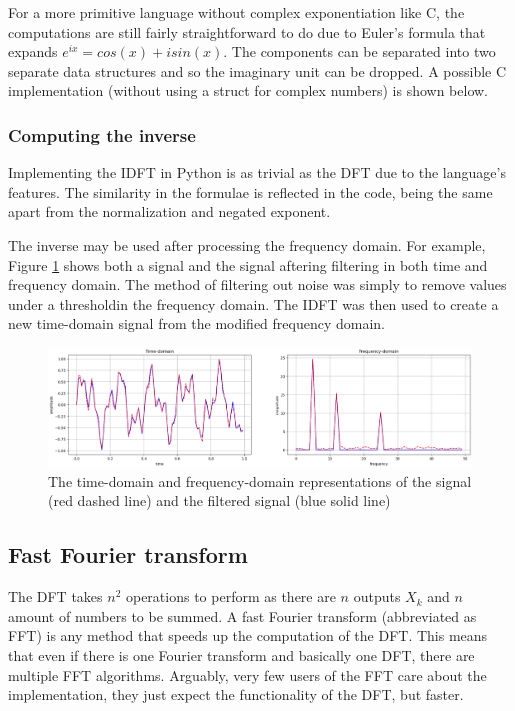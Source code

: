

For a more primitive language without complex exponentiation like C, the computations are still fairly straightforward to do due to Euler's formula that expands $e^{ix} = cos(x) + isin(x)$. The components can be separated into two separate data structures and so the imaginary unit can be dropped. A possible C implementation (without using a struct for complex numbers) is shown below. 



\subsubsection{Computing the inverse}

Implementing the IDFT in Python is as trivial as the DFT due to the language's features. The similarity in the formulae is reflected in the code, being the same apart from the normalization and negated exponent. 



The inverse may be used after processing the frequency domain. For example,  Figure \ref{fig:DFT-IDFT} shows both a signal and the signal aftering filtering in both time and frequency domain. The method of filtering out noise was simply to remove values under a thresholdin the frequency domain. The IDFT was then used to create a new time-domain signal from the modified frequency domain.

\begin{figure}[ht]
    \centering
    \includegraphics[width=\textwidth]{./images/filtered_signal.png}
    \caption{The time-domain and frequency-domain representations of the signal (red dashed line) and the filtered signal (blue solid line)\label{fig:DFT-IDFT}}
\end{figure}

\subsection{Fast Fourier transform}
The DFT takes $n^2$ operations to perform as there are $n$ outputs $X_k$ and $n$ amount of numbers to be summed. A fast Fourier transform (abbreviated as FFT) is any method that speeds up the computation of the DFT. This means that even if there is one Fourier transform and basically one DFT, there are multiple FFT algorithms. Arguably, very few users of the FFT care about the implementation, they just expect the functionality of the DFT, but faster. 

